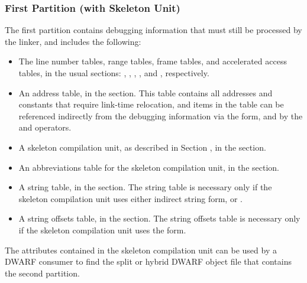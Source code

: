 \subsubsection{First Partition (with Skeleton Unit)}
The first partition contains
debugging information that must still be processed by the linker,
and includes the following:
\begin{itemize}
\item
The line number tables, range tables, frame tables, and
accelerated access tables, in the usual sections:
\dotdebugline, \dotdebuglinestr, \dotdebugranges, \dotdebugframe,
\dotdebugnames{} and \dotdebugaranges,
respectively.
\item
An address table, in the \dotdebugaddr{} section. This table
contains all addresses and constants that require
link-time relocation, and items in the table can be
referenced indirectly from the debugging information via
the \DWFORMaddrx{} form, and by the \DWOPaddrx{} and
\DWOPconstx{} operators.
\item
A skeleton compilation unit, as described in Section
, 
in the \dotdebuginfo{} section.
\item
An abbreviations table for the skeleton compilation unit,
in the \dotdebugabbrev{} section.
\item
A string table, in the \dotdebugstr{} section. The string
table is necessary only if the skeleton compilation unit
uses either indirect string form, \DWFORMstrp{} or
\DWFORMstrx.
\item
A string offsets table, in the \dotdebugstroffsets{}
section. The string offsets table is necessary only if
the skeleton compilation unit uses the \DWFORMstrx{} form.
\end{itemize}
The attributes contained in the skeleton compilation
unit can be used by a DWARF consumer to find the split or 
hybrid DWARF object file that contains the second partition.

